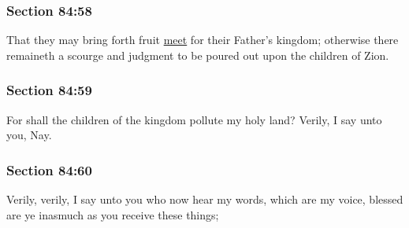 	\subsubsection{Section 84:58} %
		\label{DC84-58}

		That they may bring forth fruit \hyperref[MEET]{meet} for their Father's kingdom; otherwise there remaineth a scourge and judgment to be poured out upon the children of Zion.


	\subsubsection{Section 84:59} %
		\label{DC84-59}

		For shall the children of the kingdom pollute my holy land?  Verily, I say unto you, Nay.



	\subsubsection{Section 84:60} %
		\label{DC84-60}

		Verily, verily, I say unto you who now hear my words, which are my voice, blessed are ye inasmuch as you receive these things;


